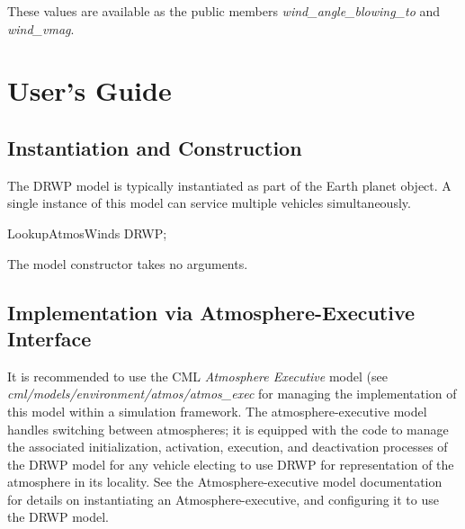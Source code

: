 \documentclass[11pt,fleqn]{report}
\begin{document}
These values are available as the public members
\textit{wind\_angle\_blowing\_to} and \textit{wind\_vmag}.


\chapter{User's Guide}

\section{Instantiation and Construction}
The DRWP model is typically instantiated as part of the Earth planet
object. A single instance of this model can service multiple vehicles
simultaneously.

\begin{code}
LookupAtmosWinds   DRWP;
\end{code}

The model constructor takes no arguments.


\section{Implementation via Atmosphere-Executive Interface}
It is recommended to use the CML \textit{Atmosphere Executive}
model (see \textit{cml/models/environment/atmos/atmos\_exec} for managing
the implementation of this model within a simulation framework. The
atmosphere-executive model handles switching between atmospheres; it is
equipped with the code to manage the associated initialization, activation,
execution, and deactivation processes of the DRWP model for any vehicle
electing to use DRWP for representation of the atmosphere in its locality.
See the Atmosphere-executive model documentation for
details on instantiating an Atmosphere-executive, and configuring it to use
the DRWP model.
\end{document}
